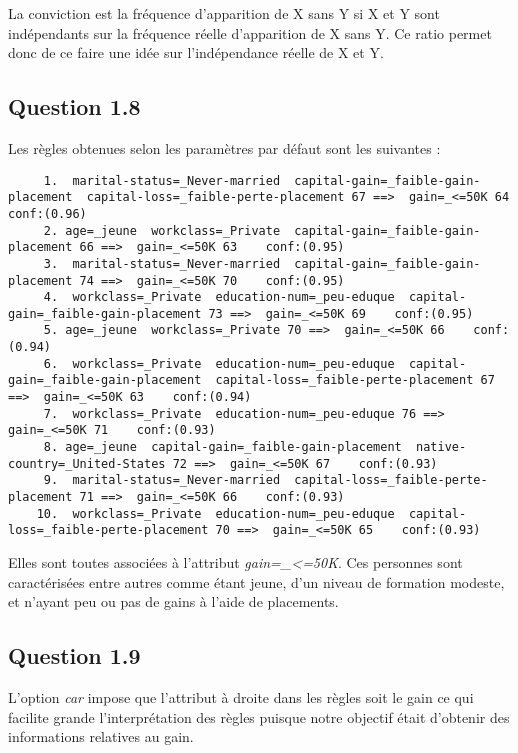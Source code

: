 \documentclass[a4paper,12pt]{article}
\begin{document}
La conviction est la fréquence d'apparition de X sans Y si X et Y sont indépendants sur la fréquence réelle d'apparition de X sans Y.
Ce ratio permet donc de ce faire une idée sur l'indépendance réelle de X et Y.


\subsection*{Question 1.8}

Les règles obtenues selon les paramètres par défaut sont les suivantes :

\begin{lstlisting}
	 1.  marital-status=_Never-married  capital-gain=_faible-gain-placement  capital-loss=_faible-perte-placement 67 ==>  gain=_<=50K 64    conf:(0.96)
	 2. age=_jeune  workclass=_Private  capital-gain=_faible-gain-placement 66 ==>  gain=_<=50K 63    conf:(0.95)
	 3.  marital-status=_Never-married  capital-gain=_faible-gain-placement 74 ==>  gain=_<=50K 70    conf:(0.95)
	 4.  workclass=_Private  education-num=_peu-eduque  capital-gain=_faible-gain-placement 73 ==>  gain=_<=50K 69    conf:(0.95)
	 5. age=_jeune  workclass=_Private 70 ==>  gain=_<=50K 66    conf:(0.94)
	 6.  workclass=_Private  education-num=_peu-eduque  capital-gain=_faible-gain-placement  capital-loss=_faible-perte-placement 67 ==>  gain=_<=50K 63    conf:(0.94)
	 7.  workclass=_Private  education-num=_peu-eduque 76 ==>  gain=_<=50K 71    conf:(0.93)
	 8. age=_jeune  capital-gain=_faible-gain-placement  native-country=_United-States 72 ==>  gain=_<=50K 67    conf:(0.93)
	 9.  marital-status=_Never-married  capital-loss=_faible-perte-placement 71 ==>  gain=_<=50K 66    conf:(0.93)
	10.  workclass=_Private  education-num=_peu-eduque  capital-loss=_faible-perte-placement 70 ==>  gain=_<=50K 65    conf:(0.93)
\end{lstlisting}

Elles sont toutes associées à l'attribut \textit{gain=\_<=50K}.
Ces personnes sont caractérisées entre autres comme étant jeune, d'un niveau de formation modeste, et n'ayant peu ou pas de gains à l'aide de placements.


\subsection*{Question 1.9}

L'option \textit{car} impose que l'attribut à droite dans les règles soit le gain ce qui facilite grande l'interprétation des règles puisque notre objectif était d'obtenir des informations relatives au gain.
\end{document}
